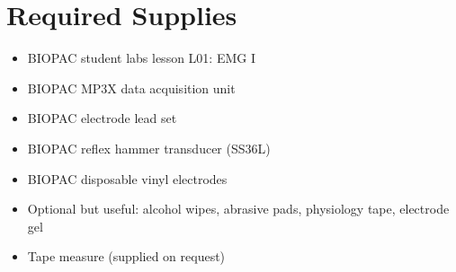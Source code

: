 \documentclass{article}
\begin{document}
\section*{Required Supplies}
\begin{itemize}
	\item BIOPAC student labs lesson L01: EMG I
	\item BIOPAC MP3X data acquisition unit
	\item BIOPAC electrode lead set
	\item BIOPAC reflex hammer transducer (SS36L)
	\item BIOPAC disposable vinyl electrodes
	\item Optional but useful: alcohol wipes, abrasive pads, physiology tape, electrode gel
	\item Tape measure (supplied on request)
\end{itemize}
\end{document}
